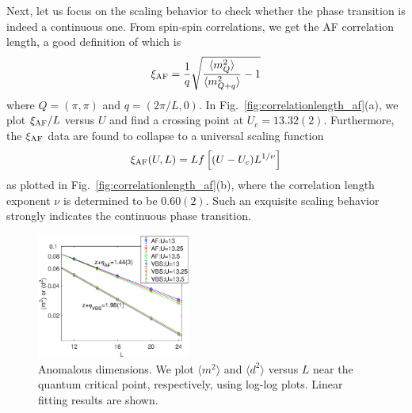 \documentclass[twocolumn,superscriptaddress,prb]{revtex4-1}
\begin{document}
Next, let us focus on the scaling behavior to check whether the phase transition is indeed a continuous one. From spin-spin correlations, we get the AF correlation length, a good definition of which is \cite{Sandvik_ACP_2010}
\begin{eqnarray}
  \xi_{\rm AF}=\frac{1}{q}\sqrt{\frac{\langle m_Q^2 \rangle}{\langle m_{Q+q}^2 \rangle}-1}
\end{eqnarray}
where $Q=(\pi,\pi)$ and $q=(2\pi/L,0)$. In Fig.~\ref{fig:correlationlength_af}(a), we plot $\xi_{\rm AF}/L$ versus $U$ and find a crossing point at $U_c=13.32(2)$. Furthermore, the $\xi_{\rm AF}$ data are found to collapse to a universal scaling function
\begin{eqnarray}\label{eq:scalinghypothesis}
  \xi_{\rm AF}(U,L)=L f\left[(U-U_c)L^{1/\nu}\right] 
\end{eqnarray}
as plotted in Fig.~\ref{fig:correlationlength_af}(b), where the correlation length exponent $\nu$ is determined to be $0.60(2)$. Such an exquisite scaling behavior strongly indicates the continuous phase transition. 


\begin{figure}
    \includegraphics[width=0.45\textwidth]{etaexponent}
    \caption{\label{fig:etaexponent}Anomalous dimensions. We plot $\langle m^2 \rangle$ and $\langle d^2 \rangle$ versus $L$ near the quantum critical point, respectively, using log-log plots. Linear fitting results are shown. }
\end{figure}
\end{document}
